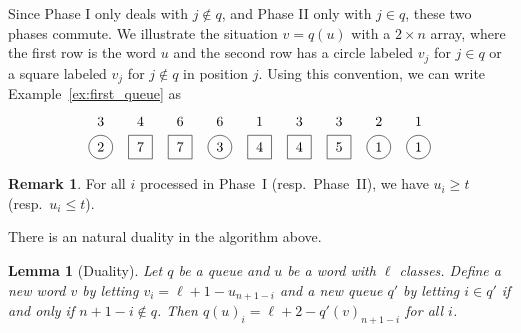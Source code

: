 \documentclass[reqno]{amsart}
\newcommand{\0}{\phantom{c}}
\DeclareMathOperator{\inter}{int} %
\newcommand{\defn}[1]{{\color{darkred}\emph{#1}}} %
\theoremstyle{plain}
\newtheorem{lemma}[thm]{Lemma}
\theoremstyle{definition}
\newtheorem{remark}[thm]{Remark}
\numberwithin{equation}{section}
\begin{document}
Since Phase I only deals with $j \notin q$, and Phase II only with $j\in q$, these two phases commute.
We illustrate the situation $v = q(u)$ with a $2 \times n$ array, where the first row is the word $u$
and the second row has a circle labeled $v_j$ for $j \in q$ or a square labeled $v_j$ for $j \notin q$ in position $j$.
Using this convention, we can write Example~\ref{ex:first_queue} as
\[
\begin{tikzpicture}[baseline=10]
  \def\ll{0.65}   %
  \foreach \i in {5,9} { \node at (\i,\ll) {$1$}; }
  \foreach \i in {8} { \node at (\i,\ll) {$2$}; }
  \foreach \i in {1,6,7} { \node at (\i,\ll) {$3$}; }
  \foreach \i in {2} { \node at (\i,\ll) {$4$}; }
  \foreach \i in {3,4} { \node at (\i,\ll) {$6$}; }
  \foreach \i in {1,4,8,9} { \draw (\i,0) circle (0.3); }
  \foreach \i in {2,3,5,6,7} { \draw (\i-.3,0-.3) rectangle +(0.6,+0.6); }
  \foreach \i in {8,9} { \node at (\i,0) {$1$}; }
  \foreach \i in {1} { \node at (\i,0) {$2$}; }
  \foreach \i in {4} { \node at (\i,0) {$3$}; }
  \foreach \i in {5,6} { \node at (\i,0) {$4$}; }
  \foreach \i in {7} { \node at (\i,0) {$5$}; }
  \foreach \i in {2,3} { \node at (\i,0) {$7$}; }
\end{tikzpicture}
\]

\begin{comment}  %
Consider a pair $k, k+1 \pmod{n}$ of consecutive columns.
For $s > t$ the \defn{$s$-flow} from $k+1$ to $k$ is the number of $i$ such that $u_i=s$, and whose queueing interval $\inter[j,i]$ contains both $k$ and $k+1$.
Similarly, for $s < t$, the \defn{$s$-flow} from $k$ to $k+1$ is the number of $i$ such that $u_i = s$, and whose queueing interval $\inter[i,j]$ contains both $k$ and $k+1$.
\end{comment}

\begin{remark}
For all $i$ processed in Phase~I (resp.\ Phase~II), we have $u_i \geq t$ (resp.~$u_i \leq t$).
\end{remark}

There is an natural duality in the algorithm above.

\begin{lemma}[Duality]
  \label{le:dual}
  Let $q$ be a queue and $u$ be a word with $\ell$ classes.
  Define a new word $v$ by letting $v_i = \ell + 1 - u_{n+1-i}$ and a new queue $q'$ by letting $i \in q'$ if and only if $n+1-i \notin q$.
 Then $q(u)_i = \ell + 2 - q'(v)_{n+1-i}$ for all $i$.
\end{lemma}
\end{document}
